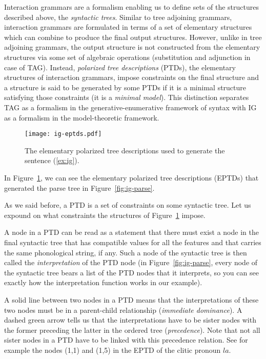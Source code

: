 Interaction grammars are a formalism enabling us to define sets of the
structures described above, the \emph{syntactic trees}. Similar to tree
adjoining grammars, interaction grammars are formulated in terms of a
set of elementary structures which can combine to produce the final
output structures. However, unlike in tree adjoining grammars, the
output structure is not constructed from the elementary structures via
some set of algebraic operations (substitution and adjunction in case of
TAG). Instead, \emph{polarized tree descriptions} (PTDs), the elementary
structures of interaction grammars, impose constraints on the final
structure and a structure is said to be generated by some PTDs if it is
a minimal structure satisfying those constraints (it is a \emph{minimal
  model}). This distinction separates TAG as a formalism in the
generative-enumerative framework of syntax with IG as a formalism in the
model-theoretic framework.

\begin{figure}
  \centering
  \texttt{[image: ig-eptds.pdf]}
  \caption{\label{fig:ig-eptds} The elementary polarized tree
    descriptions used to generate the sentence (\ref{ex:ig}).}
\end{figure}

In Figure~\ref{fig:ig-eptds}, we can see the elementary polarized tree
descriptions (EPTDs) that generated the parse tree in
Figure~\ref{fig:ig-parse}.

As we said before, a PTD is a set of constraints on some syntactic
tree. Let us expound on what constraints the structures of
Figure~\ref{fig:ig-eptds} impose.

A node in a PTD can be read as a statement that there must exist a node
in the final syntactic tree that has compatible values for all the
features and that carries the same phonological string, if any. Such a
node of the syntactic tree is then called the \emph{interpretation} of
the PTD node (in Figure~\ref{fig:ig-parse}, every node of the syntactic
tree bears a list of the PTD nodes that it interprets, so you can see
exactly how the interpretation function works in our example).

A solid line between two nodes in a PTD means that the interpretations
of these two nodes must be in a parent-child relationship
(\emph{immediate dominance}). A dashed green arrow tells us that the
interpretations have to be sister nodes with the former preceding the
latter in the ordered tree (\emph{precedence}). Note that not all sister
nodes in a PTD have to be linked with this precedence relation. See for
example the nodes (1,1) and (1,5) in the EPTD of the clitic pronoun
$la$.


